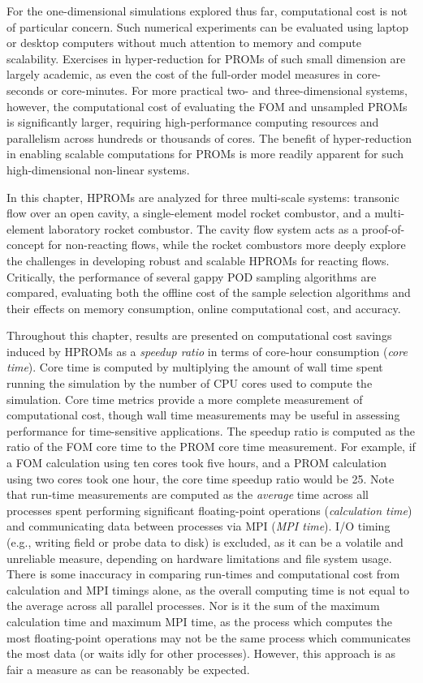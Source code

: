 For the one-dimensional simulations explored thus far, computational cost is not of particular concern. Such numerical experiments can be evaluated using laptop or desktop computers without much attention to memory and compute scalability. Exercises in hyper-reduction for PROMs of such small dimension are largely academic, as even the cost of the full-order model measures in core-seconds or core-minutes. For more practical two- and three-dimensional systems, however, the computational cost of evaluating the FOM and unsampled PROMs is significantly larger, requiring high-performance computing resources and parallelism across hundreds or thousands of cores. The benefit of hyper-reduction in enabling scalable computations for PROMs is more readily apparent for such high-dimensional non-linear systems.

In this chapter, HPROMs are analyzed for three multi-scale systems: transonic flow over an open cavity, a single-element model rocket combustor, and a multi-element laboratory rocket combustor. The cavity flow system acts as a proof-of-concept for non-reacting flows, while the rocket combustors more deeply explore the challenges in developing robust and scalable HPROMs for reacting flows. Critically, the performance of several gappy POD sampling algorithms are compared, evaluating both the offline cost of the sample selection algorithms and their effects on memory consumption, online computational cost, and accuracy.

Throughout this chapter, results are presented on computational cost savings induced by HPROMs as a \textit{speedup ratio} in terms of core-hour consumption (\textit{core time}). Core time is computed by multiplying the amount of wall time spent running the simulation by the number of CPU cores used to compute the simulation. Core time metrics provide a more complete measurement of computational cost, though wall time measurements may be useful in assessing performance for time-sensitive applications. The speedup ratio is computed as the ratio of the FOM core time to the PROM core time measurement. For example, if a FOM calculation using ten cores took five hours, and a PROM calculation using two cores took one hour, the core time speedup ratio would be 25. Note that run-time measurements are computed as the \textit{average} time across all processes spent performing significant floating-point operations (\textit{calculation time}) and communicating data between processes via MPI (\textit{MPI time}). I/O timing (e.g., writing field or probe data to disk) is excluded, as it can be a volatile and unreliable measure, depending on hardware limitations and file system usage. There is some inaccuracy in comparing run-times and computational cost from calculation and MPI timings alone, as the overall computing time is not equal to the average across all parallel processes. Nor is it the sum of the maximum calculation time and maximum MPI time, as the process which computes the most floating-point operations may not be the same process which communicates the most data (or waits idly for other processes). However, this approach is as fair a measure as can be reasonably be expected.

